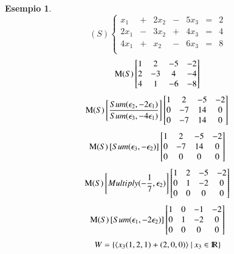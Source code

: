 \documentclass[12pt,a4paper]{article}
\theoremstyle{break}
\newtheorem{example}{Esempio}[subsection]
\newcommand\R{{\rm I\!R}}
\begin{document}
    \begin{example}
        \[
            (S)
            \left\{
                \begin{matrix}
                    x_1 & + & 2x_2 & - & 5x_3 & = & 2 \\
                    2x_1 & - & 3x_2 & + & 4x_3 & = & 4 \\
                    4x_1 & + & x_2 & - & 6x_3 & = & 8 \\
                \end{matrix}
            \right.  
        \]
        \[
          {\rm \!M}(S)
          \begin{bmatrix}
            1 & 2 & -5 & -2 \\
            2 & -3 & 4 & -4 \\
            4 & 1 & -6 & -8 \\
          \end{bmatrix}  
        \]
        \[
            {\rm \!M}(S) \left[\frac{Sum(\epsilon_2, -2\epsilon_1)}{Sum(\epsilon_3, -4\epsilon_1)}\right]
            \begin{bmatrix}
                1 & 2 & -5 & -2 \\
                0 & -7 & 14 & 0 \\
                0 & -7 & 14 & 0 \\
            \end{bmatrix}
        \]
        \[
            {\rm \!M}(S) \left[Sum(\epsilon_3, -\epsilon_2)\right]
            \begin{bmatrix}
                1 & 2 & -5 & -2 \\
                0 & -7 & 14 & 0 \\
                0 & 0 & 0 & 0 \\
            \end{bmatrix}
        \]
        \[
            {\rm \!M}(S) \left[Multiply(-\frac{1}{7}, \epsilon_2)\right]
            \begin{bmatrix}
                1 & 2 & -5 & -2 \\
                0 & 1 & -2 & 0 \\
                0 & 0 & 0 & 0 \\
            \end{bmatrix}
        \]
        \[
            {\rm \!M}(S) \left[Sum(\epsilon_1, -2\epsilon_2)\right]
            \begin{bmatrix}
                1 & 0 & -1 & -2 \\
                0 & 1 & -2 & 0 \\
                0 & 0 & 0 & 0 \\
            \end{bmatrix}
        \]
        \[
        W = \{\langle x_3(1,2,1) + (2,0,0)\rangle\ |\: x_3\in\R\}    
        \]
    \end{example}
    \newpage
\end{document}
